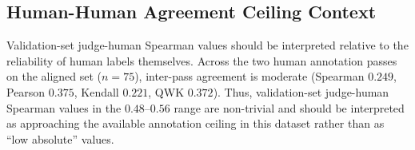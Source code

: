 \documentclass{article}
\begin{document}
\begin{table}[t]
  \centering
  \small
  \caption{\textbf{Naive blind baseline vs.\ validation labels (0--5 scale).}
    \(\rho_s\): Spearman, \(r\): Pearson, \(\tau\): Kendall; MAE is absolute error on the 0--5 scale.
    This baseline is included as a sanity-check negative control and is not used for final ranking claims.}
  \label{tab:app-naive-blind-baseline}
\end{table}

\subsection{Human-Human Agreement Ceiling Context}
Validation-set judge-human Spearman values should be interpreted relative to the reliability of human labels themselves.
Across the two human annotation passes on the aligned set (\(n=75\)), inter-pass agreement is moderate (Spearman \(0.249\), Pearson \(0.375\), Kendall \(0.221\), QWK \(0.372\)).
Thus, validation-set judge-human Spearman values in the \(0.48\)--\(0.56\) range are non-trivial and should be interpreted as approaching the available annotation ceiling in this dataset rather than as ``low absolute'' values.
\end{document}
